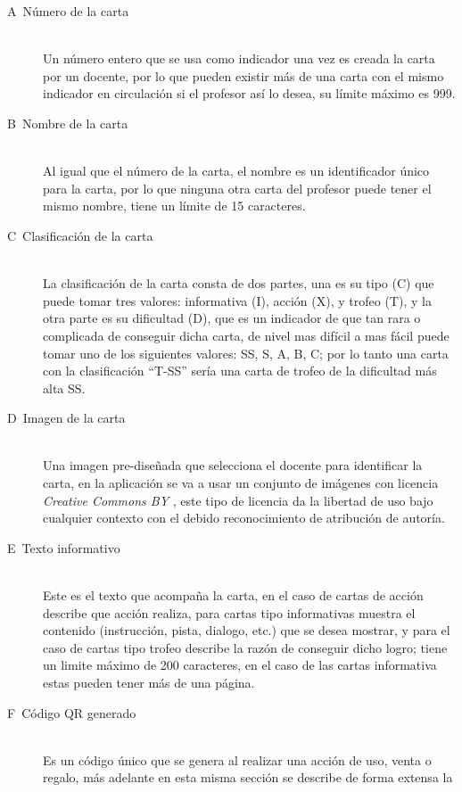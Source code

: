 \begin{description}
  \item[\textlangle A\textrangle\ Número de la carta] \hfill \\ Un número entero que se usa como indicador 
	una vez es creada la carta por un docente, por lo que pueden existir más de una carta con el mismo 
	indicador en circulación si el profesor así lo desea, su límite máximo es 999.
  \item[\textlangle B\textrangle\ Nombre de la carta] \hfill \\ Al igual que el número de la carta, el nombre 
	es un identificador único para la carta, por lo que ninguna otra carta del profesor puede tener el 
	mismo nombre, tiene un límite de 15 caracteres.
  \item[\textlangle C\textrangle\ Clasificación de la carta] \hfill \\ La clasificación de la carta consta de 
	dos partes, una es su tipo (C) que puede tomar tres valores: informativa (I), acción (X), y trofeo 
	(T), y la otra parte es su dificultad (D), que es un indicador de que tan rara o complicada de 
	conseguir dicha carta, de nivel mas difícil a mas fácil puede tomar uno de los siguientes valores:
	SS, S, A, B, C; por lo tanto una carta con la clasificación ``T-SS'' sería una carta de trofeo de la
	dificultad más alta SS.
  \item[\textlangle D\textrangle\ Imagen de la carta] \hfill \\ Una imagen pre-diseñada que selecciona el 
	docente para identificar la carta, en la aplicación se va a usar un conjunto de imágenes con licencia 
	\textit{Creative Commons BY} {\Large \ccby}, este tipo de licencia da la libertad de uso bajo cualquier 
	contexto con el debido reconocimiento de atribución de autoría.
  \item[\textlangle E\textrangle\ Texto informativo] \hfill \\ Este es el texto que acompaña la carta, en el 
	caso de cartas de acción describe que acción realiza, para cartas tipo informativas muestra el 
	contenido (instrucción, pista, dialogo, etc.) que se desea mostrar, y para el caso de cartas tipo 
	trofeo describe la razón de conseguir dicho logro; tiene un limite máximo de 200 caracteres, en el 
	caso de las cartas informativa estas pueden tener más de una página.
  \item[\textlangle F\textrangle\ Código QR generado] \hfill \\ Es un código único que se genera al realizar 
	una acción de uso, venta o regalo, más adelante en esta misma sección se describe de forma extensa la 

\end{description}
